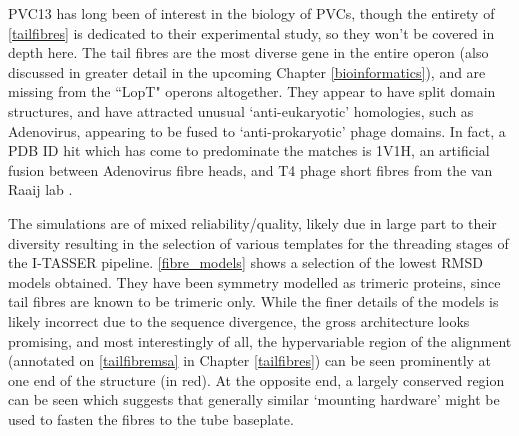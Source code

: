 PVC13 has long been of interest in the biology of PVCs, though the entirety of \vref{tailfibres} is dedicated to their experimental study, so they won't be covered in depth here. The tail fibres are the most diverse gene in the entire operon (also discussed in greater detail in the upcoming Chapter \ref{bioinformatics}), and are missing from the ``LopT" operons altogether. They appear to have split domain structures, and have attracted unusual `anti-eukaryotic' homologies, such as Adenovirus, appearing to be fused to `anti-prokaryotic' phage domains. In fact, a PDB ID hit which has come to predominate the matches is 1V1H, an artificial fusion between Adenovirus fibre heads, and T4 phage short fibres from the van Raaij lab \citep{Papanikolopoulou2004}.

The simulations are of mixed reliability/quality, likely due in large part to their diversity resulting in the selection of various templates for the threading stages of the I-TASSER pipeline. \vref{fibre_models} shows a selection of the lowest RMSD models obtained. They have been symmetry modelled as trimeric proteins, since tail fibres are known to be trimeric only. While the finer details of the models is likely incorrect due to the sequence divergence, the gross architecture looks promising, and most interestingly of all, the hypervariable region of the alignment (annotated on \vref{tailfibremsa} in Chapter \ref{tailfibres}) can be seen prominently at one end of the structure (in red). At the opposite end, a largely conserved region can be seen which suggests that generally similar `mounting hardware' might be used to fasten the fibres to the tube baseplate.

